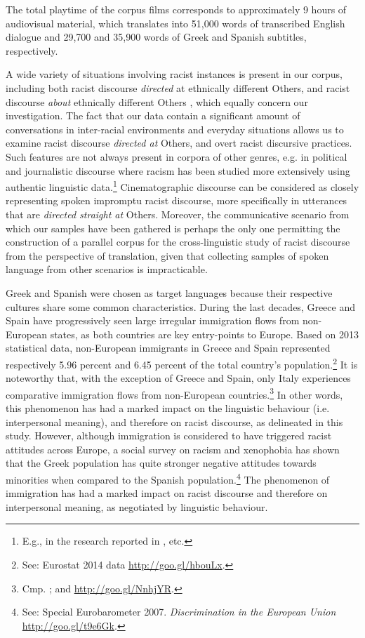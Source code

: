 \documentclass[output=paper]{LSP/langsci}
\begin{document}
The total playtime of the corpus films corresponds to approximately 9 hours of audiovisual material, which translates into 51,000 words of transcribed English dialogue and 29,700 and 35,900 words of Greek and Spanish subtitles, respectively.

A wide variety of situations involving racist instances is present in our corpus, including both racist discourse \textit{directed} at ethnically different Others, and racist discourse \textit{about} ethnically different Others \citep[351]{Dijk2004}, which equally concern our investigation. The fact that our data contain a significant amount of conversations in inter-racial environments and everyday situations allows us to examine racist discourse \textit{directed at} Others, and overt racist discursive practices. Such features are not always present in corpora of other genres, e.g. in political and journalistic discourse where racism has been studied more extensively using authentic linguistic data.\footnote{E.g., in the research reported in \citet{BakerGabrielatos2008,Dijk1993}, etc.} Cinematographic discourse can be considered as closely representing spoken impromptu racist discourse, more specifically in utterances that are \textit{directed straight at} Others. Moreover, the communicative scenario from which our samples have been gathered is perhaps the only one permitting the construction of a parallel corpus for the cross-linguistic study of racist discourse from the perspective of translation, given that collecting samples of spoken language from other scenarios is impracticable.

Greek and Spanish were chosen as target languages because their respective cultures share some common characteristics. During the last decades,  Greece and Spain have progressively seen large irregular immigration flows from non-European states, as both countries are key entry-points to Europe. Based on 2013 statistical data, non-European immigrants in Greece and Spain represented respectively 5.96 percent and 6.45 percent of the total country's population.\footnote{See: Eurostat 2014 data \url{http://goo.gl/hbouLx}.} It is noteworthy that, with the exception of Greece and Spain, only Italy experiences comparative immigration flows from non-European countries.\footnote{Cmp. \citet[4]{Vasileva2011}; and \url{http://goo.gl/NnhjYR}.} In other words, this phenomenon has had a marked impact on the linguistic behaviour (i.e. interpersonal meaning), and therefore on racist discourse, as delineated in this study. However, although immigration is considered to have triggered racist attitudes across Europe, a social survey on racism and xenophobia has shown that the Greek population has quite stronger negative attitudes towards minorities when compared to the Spanish population.\footnote{See: Special Eurobarometer 2007. \textit{Discrimination in the European Union} \url{http://goo.gl/t9e6Gk}.} The phenomenon of immigration has had a marked impact on racist discourse and therefore on interpersonal meaning, as negotiated by linguistic behaviour.
\end{document}
